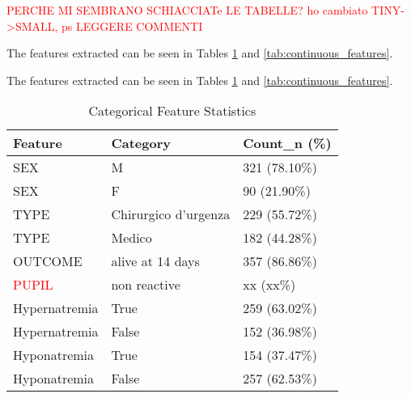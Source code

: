 \textcolor{red}{PERCHE MI SEMBRANO SCHIACCIATe LE TABELLE? ho cambiato TINY->SMALL, ps LEGGERE COMMENTI}

The features extracted can be seen in Tables \ref{tab:categorical_features} and \ref{tab:continuous_features}.

The features extracted can be seen in Tables \ref{tab:categorical_features} and \ref{tab:continuous_features}.

\begin{table}[h!]
    \centering
    \small %
    \begin{tabular}{lll}
    \hline
    \textbf{Feature} & \textbf{Category} & \textbf{Count\_n (\%)} \\
    \hline
    SEX & M & 321 (78.10\%) \\
    SEX & F & 90 (21.90\%) \\
    TYPE & Chirurgico d’urgenza & 229 (55.72\%) \\
    TYPE & Medico & 182 (44.28\%) \\
    OUTCOME & alive at 14 days & 357 (86.86\%) \\
    \textcolor{red}{PUPIL} & non reactive & xx (xx\%) \\ %
    Hypernatremia & True & 259 (63.02\%) \\ 
    Hypernatremia & False & 152 (36.98\%) \\
    Hyponatremia & True & 154 (37.47\%) \\
    Hyponatremia & False & 257 (62.53\%) \\
    \hline
    \end{tabular}
    \caption{Categorical Feature Statistics}
    \label{tab:categorical_features}
\end{table}


